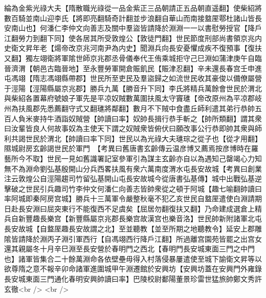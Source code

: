 綸為金紫光祿大夫【隋散職光祿從一品金紫正三品朝請正五品朝直遥翻】使柴紹將數百騎並南山迎李氏【將即亮翻騎奇計翻並步浪翻自華山而南接盩厔鄠杜諸山皆長安南山也】何潘仁李仲文向善志及關中羣盜皆請降於淵淵一一以書慰勞授官【降戶江翻勞力到翻下同】使各居其所受敦煌公【敦徒門翻】世民節度刑部尚書領京兆内史衛文昇年老【煬帝改京兆河南尹為内史】聞淵兵向長安憂懼成疾不復預事【復扶又翻】獨左翊衛將軍隂世師京兆郡丞骨儀奉代王侑乘城拒守己巳淵如蒲津庚午自臨晉濟渭【朝邑古臨晉地】至永豐勞軍開倉賑飢民【賑津忍翻】辛未還長春宫壬申進屯馮翊【隋志馮翊縣帶郡】世民所至吏民及羣盜歸之如流世民收其豪俊以備僚屬營于涇陽【涇陽縣屬京兆郡】勝兵九萬【勝音升下同】李氏將精兵萬餘會世民於渭北與柴紹各置幕府號娘子軍先是平凉奴賊數萬圍扶風太守竇璡【帝改原州為平凉郡岐州為扶風郡先悉薦翻守式又翻璡將鄰翻】數月不下賊中食盡丘師利遣其弟行恭帥五百人負米麥持牛酒詣奴賊營【帥讀曰率】奴帥長揖行恭手斬之【帥所類翻】謂其衆曰汝輩皆良人何故事奴為主使天下謂之奴賊衆皆俯伏曰願改事公行恭即帥其衆與師利共謁世民於渭北【帥讀曰率下同】世民以為光祿大夫璡琮之從子也【從才用翻】隰城尉房玄齡謁世民於軍門　【考異曰舊唐書玄齡傳云温彦博又薦焉按彦博時在羅藝所今不取】世民一見如舊識署記室參軍引為謀主玄齡亦自以為遇知己罄竭心力知無不為淵命劉弘基殷開山分兵西畧扶風有衆六萬南度渭水屯長安故城【考異曰創業注云敦煌公自涇陽趨司竹留弘基開山屯長安故城今從唐書弘基傳】城中出戰弘基逆擊破之世民引兵趣司竹李仲文何潘仁向善志皆帥衆從之頓于阿城【趣七喻翻帥讀曰率阿城即秦阿房宫城】勝兵十三萬軍令嚴整秋毫不犯乙亥世民自盩厔遣使白淵請期日赴長安淵曰屈突東行不能復西不足虞矣【屈居勿翻復扶又翻】乃命建成選倉上精兵自新豐趣長樂宫【新豐縣屬京兆郡長樂宫故漢宫也樂音洛】世民帥新附諸軍北屯長安故城【自盩厔趣長安故謂之北】至並聽教【並至所期之地聽教令】延安上郡雕隂皆請降於淵丙子淵引軍西行【自馮翊西行降戶江翻】所過離宫園苑皆罷之出宫女還其親屬冬十月辛巳淵至長安營於春明門之西北【春明門長安城東面三門之中門也】諸軍皆集合二十餘萬淵命各依壁壘毋得入村落侵暴屢遣使至城下諭衛文昇等以欲尊隋之意不報辛卯命諸軍進圍城甲午淵遷館於安興坊【安興坊蓋在安興門外雍錄長安城東面三門通化春明安興帥讀曰率】巴陵校尉鄱陽董景珍雷世猛旅帥鄭文秀許玄徹<br />
<br />
